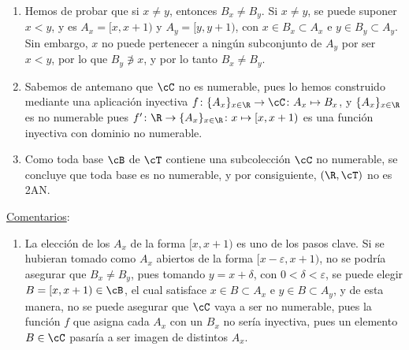 \begin{ej}
\begin{enumerate}[topsep=5pt,itemsep=0pt]
        \item Hemos de probar que si $x \neq y$, entonces $B_x \neq B_y$. Si $x \neq y$, se puede suponer $x < y$, y es $A_x = [x,x + 1)$ y $A_y = [y,y + 1)$, con $x\in B_x \subset A_x$ e $y\in B_y \subset A_y$. Sin embargo, $x$ no puede pertenecer a ningún subconjunto de $A_y$ por ser $x < y$, por lo que $B_y \not\ni x$, y por lo tanto $B_x \neq B_y$. 
        \item Sabemos de antemano que $\cC$ no es numerable, pues lo hemos construido mediante una aplicación inyectiva $f\colon \{A_x\}_{x\in \R} \to \cC\colon A_x \mapsto B_x$, y $\{A_x\}_{x\in \R}$ es no numerable pues $f'\colon \R \to \{A_x\}_{x\in \R} \colon x \mapsto [x,x+1)$ es una función inyectiva con dominio no numerable.
        \item Como toda base $\cB$ de $\cT$ contiene una subcolección $\cC$ no numerable, se concluye que toda base es no numerable, y por consiguiente, $(\R, \cT)$ no es 2AN.
    \end{enumerate}

    \underline{Comentarios}: 
    \begin{enumerate}[topsep=5pt,label=--]
        \item La elección de los $A_x$ de la forma $[x,x+1)$ es uno de los pasos clave. Si se hubieran tomado como $A_x$ abiertos de la forma $[x-\varepsilon, x + 1)$, no se podría asegurar que $B_x \neq B_y$, pues tomando $y = x + \delta$, con $0 < \delta < \varepsilon$, se puede elegir $B = [x, x+1) \in\cB$, el cual satisface $x\in B \subset A_x$ e $y\in B \subset A_y$, y de esta manera, no se puede asegurar que $\cC$ vaya a ser no numerable, pues la función $f$ que asigna cada $A_x$ con un $B_x$ no sería inyectiva, pues un elemento $B\in\cC$ pasaría a ser imagen de distintos $A_x$.
        \begin{center}
\end{center}
\end{enumerate}
\end{ej}
